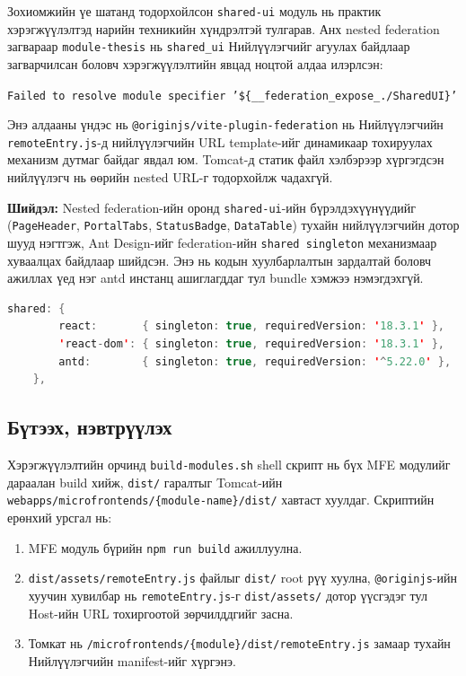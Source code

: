 Зохиомжийн үе шатанд тодорхойлсон \texttt{shared-ui} модуль нь практик хэрэгжүүлэлтэд
нарийн техникийн хүндрэлтэй тулгарав. Анх nested federation загвараар 
\texttt{module-thesis} нь \texttt{shared\_ui} Нийлүүлэгчийг агуулах байдлаар загварчилсан боловч хэрэгжүүлэлтийн явцад ноцтой алдаа илэрлсэн:

\texttt{Failed to resolve module specifier '\$\{\_\_federation\_expose\_./SharedUI\}'}

Энэ алдааны үндэс нь \texttt{@originjs/vite-plugin-federation} нь
Нийлүүлэгчийн \texttt{remoteEntry.js}-д нийлүүлэгчийн URL template-ийг
динамикаар тохируулах механизм дутмаг байдаг явдал юм. Tomcat-д статик
файл хэлбэрээр хүргэгдсэн нийлүүлэгч нь өөрийн nested URL-г
тодорхойлж чадахгүй.

\textbf{Шийдэл:} Nested federation-ийн оронд \texttt{shared-ui}-ийн
бүрэлдэхүүнүүдийг (\texttt{PageHeader}, \texttt{PortalTabs},
\texttt{StatusBadge}, \texttt{DataTable}) тухайн нийлүүлэгчийн дотор шууд
нэгтгэж, Ant Design-ийг federation-ийн \texttt{shared singleton}
механизмаар хуваалцах байдлаар шийдсэн. Энэ нь кодын хуулбарлалтын зардалтай боловч
ажиллах үед нэг antd инстанц ашиглагддаг тул bundle хэмжээ нэмэгдэхгүй.


\begin{lstlisting}[language=Java, caption={Shared Singleton загварын зохицуулалт. Antd нь нэгдсэн singleton хэлбэрт ачааллагдаж, Remote модуль бүр энэ нэг instance-ийг ашиглана}, label={lst:shared_singleton}]
	shared: {
		react:       { singleton: true, requiredVersion: '18.3.1' },
		'react-dom': { singleton: true, requiredVersion: '18.3.1' },
		antd:        { singleton: true, requiredVersion: '^5.22.0' },
	},
\end{lstlisting}

\subsection{Бүтээх, нэвтрүүлэх}

Хэрэгжүүлэлтийн орчинд \texttt{build-modules.sh} shell скрипт нь
бүх MFE модулийг дараалан build хийж, \texttt{dist/} гаралтыг
Tomcat-ийн \texttt{webapps/microfrontends/\{module-name\}/dist/}
хавтаст хуулдаг. Скриптийн ерөнхий урсгал нь:

\begin{enumerate}
  \item MFE модуль бүрийн \texttt{npm run build} ажиллуулна.
  \item \texttt{dist/assets/remoteEntry.js} файлыг \texttt{dist/}
    root рүү хуулна, \texttt{@originjs}-ийн хуучин хувилбар нь
    \texttt{remoteEntry.js}-г \texttt{dist/assets/} дотор үүсгэдэг
    тул Host-ийн URL тохиргоотой зөрчилддгийг засна.
  \item Томкат нь \texttt{/microfrontends/\{module\}/dist/remoteEntry.js}
    замаар тухайн Нийлүүлэгчийн manifest-ийг хүргэнэ.
\end{enumerate}

